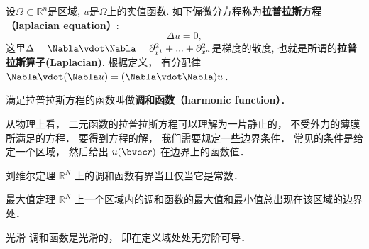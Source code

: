 
\begin{issues}
\issueDraft
\end{issues}


设$\Omega\subset\mathbb{R}^n$是区域, $u$是$\Omega$上的实值函数. 如下偏微分方程称为\textbf{拉普拉斯方程（laplacian equation）}:
\begin{equation}
\Delta u = 0,
\end{equation}
这里$\Delta=\Nabla\vdot\Nabla=\partial_{x^1}^2+...+\partial_{x^n}^2$是梯度的散度, 也就是所谓的\textbf{拉普拉斯算子(Laplacian)}. 根据定义， 有分配律 $\Nabla \vdot (\Nabla u) = (\Nabla \vdot \Nabla) u$．

满足拉普拉斯方程的函数叫做\textbf{调和函数（harmonic function）}．

从物理上看， 二元函数的拉普拉斯方程可以理解为一片静止的， 不受外力的薄膜所满足的方程． 要得到方程的解， 我们需要规定一些边界条件． 常见的条件是给定一个区域， 然后给出 $u(\bvec r)$ 在边界上的函数值．

\begin{theorem}{刘维尔定理}\label{LapEq_the1}
$\mathbb R^N$ 上的调和函数有界当且仅当它是常数．
\end{theorem}

\begin{theorem}{最大值定理}
$\mathbb R^N$ 上一个区域内的调和函数的最大值和最小值总出现在该区域的边界处．
\end{theorem}

\begin{theorem}{光滑}
调和函数是光滑的， 即在定义域处处无穷阶可导．
\end{theorem}
